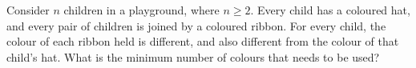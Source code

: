 \documentclass[varwidth]{standalone}
\begin{document}
    Consider $n$ children in a playground, where $n \geq 2$. Every child has a coloured hat, and every pair of children is joined by a coloured ribbon. For every child, the colour of each ribbon held is different, and also different from the colour of that child's hat. What is the minimum number of colours that needs to be used?
\end{document}
